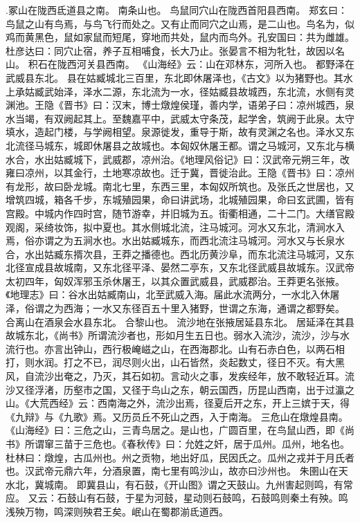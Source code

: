 \documentclass[12pt,UTF8]{ctexbook}
\begin{document}
.冢山在陇西氐道县之南。
南条山也。
鸟鼠同穴山在陇西首阳县西南。
郑玄曰：鸟鼠之山有鸟焉，与鸟飞行而处之。又有止而同穴之山焉，是二山也。鸟名为，似鸡而黄黑色，鼠如家鼠而短尾，穿地而共处，鼠内而鸟外。孔安国曰：共为雌雄。杜彦达曰：同穴止宿，养子互相哺食，长大乃止。张晏言不相为牝牡，故因以名山。
积石在陇西河关县西南。
《山海经》云：山在邓林东，河所入也。
都野泽在武威县东北。
县在姑臧城北三百里，东北即休屠泽也，《古文》以为猪野也。其水上承姑臧武始泽，泽水二源，东北流为一水，径姑臧县故城西，东北流，水侧有灵渊池。王隐《晋书》曰：汉末，博士燉煌侯瑾，善内学，语弟子曰：凉州城西，泉水当竭，有双阙起其上。至魏嘉平中，武威太守条茂，起学舍，筑阙于此泉。太守填水，造起门楼，与学阙相望。泉源徙发，重导于斯，故有灵渊之名也。泽水又东北流径马城东，城即休屠县之故城也。本匈奴休屠王都。谓之马城河，又东北与横水合，水出姑臧城下，武威郡，凉州治。《地理风俗记》曰：汉武帝元朔三年，改雍曰凉州，以其金行，土地寒凉故也。迁于冀，晋徙治此。王隐《晋书》曰：凉州有龙形，故曰卧龙城。南北七里，东西三里，本匈奴所筑也。及张氏之世居也，又增筑四城，箱各千步，东城殖园果，命曰讲武场，北城殖园果，命曰玄武圃，皆有宫殿。中城内作四时宫，随节游幸，并旧城为五。街衢相通，二十二门。大缮官殿观阁，采绮妆饰，拟中夏也。其水侧城北流，注马城河。河水又东北，清涧水入焉，俗亦谓之为五涧水也。水出姑臧城东，而西北流注马城河。河水又与长泉水合，水出姑臧东揟次县，王莽之播德也。西北历黄沙阜，而东北流注马城河，又东北径宣成县故城南，又东北径平泽、晏然二亭东，又东北径武威县故城东。汉武帝太初四年，匈奴浑邪玉杀休屠王，以其众置武威县，武威郡治。王莽更名张掖。《地理志》曰：谷水出姑臧南山，北至武威入海。届此水流两分，一水北入休屠泽，俗谓之为西海；一水又东径百五十里入猪野，世谓之东海，通谓之都野矣。
合离山在酒泉会水县东北。
合黎山也。
流沙地在张掖居延县东北。
居延泽在其县故城东北，《尚书》所谓流沙者也，形如月生五日也。弱水入流沙，流沙，沙与水流行也。亦言出钟山，西行极崦嵫之山，在西海郡北。山有石赤白色，以两石相打，则水润。打之不已，润尽则火出，山石皆然，炎起数丈，径日不灭。有大黑风，自流沙出奄之，乃灭，其石如初。言动火之事，发疾经年，放不敢轻近耳。流沙又径浮渚，历壑市之国，又径于鸟山之东，朝云国西，历昆山西南，出于过瀛之山。《大荒西经》云：西南海之外，流沙出焉，径夏后开之东，开上三嫔于天，得《九辩》与《九歌》焉。又历员丘不死山之西，入于南海。
三危山在燉煌县南。
《山海经》曰：三危之山，三青鸟居之。是山也，广圆百里，在鸟鼠山西，即《尚书》所谓窜三苗于三危也。《春秋传》曰：允姓之奸，居于瓜州。瓜州，地名也。杜林曰：燉煌，古瓜州也。州之贡物，地出好瓜，民因氏之。瓜州之戎并于月氏者也。汉武帝元鼎六年，分酒泉置，南七里有鸣沙山，故亦曰沙州也。
朱圉山在天水北，冀城南。
即冀县山，有石鼓，《开山图》谓之天鼓山。九州害起则鸣，有常应。
又云：石鼓山有石鼓，于星为河鼓，星动则石鼓鸣，石鼓鸣则秦土有殃。鸣浅殃万物，鸣深则殃君王矣。岷山在蜀郡湔氐道西。
\end{document}
